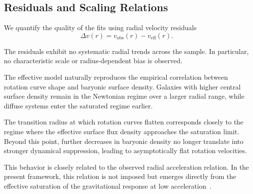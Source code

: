 \subsection{Residuals and Scaling Relations}
  \label{subsec:residuals}

  We quantify the quality of the fits using radial velocity residuals
  \begin{equation}
    \Delta v(r) = v_{\mathrm{obs}}(r) - v_{\mathrm{eff}}(r) .
  \end{equation}

  The residuals exhibit no systematic radial trends across the sample.
  In particular, no characteristic scale or radius-dependent bias is observed.

  The effective model naturally reproduces the empirical correlation between
  rotation curve shape and baryonic surface density.
  Galaxies with higher central surface density remain in the Newtonian regime
  over a larger radial range, while diffuse systems enter the saturated regime earlier.

  The transition radius at which rotation curves flatten corresponds closely to
  the regime where the effective surface flux density approaches the saturation limit.
  Beyond this point, further decreases in baryonic density no longer translate
  into stronger dynamical suppression, leading to asymptotically flat rotation velocities.

  This behavior is closely related to the observed radial acceleration relation.
  In the present framework, this relation is not imposed but emerges directly
  from the effective saturation of the gravitational response at low acceleration~\cite{McGaugh2016}.
